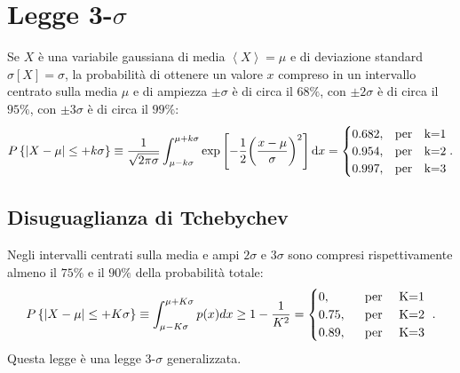\section{Legge 3-$\sigma$} %
\label{sec:tre-sigma}
Se $X$ è una variabile gaussiana di media $\left< X \right> =\mu $ e di deviazione standard $\sigma \left[ X \right] =\sigma $, la probabilità di ottenere un valore $x$ compreso in un intervallo centrato sulla media $\mu$ e di ampiezza $\pm \sigma$ è di circa il $68\%$, con $\pm 2\sigma$ è di circa il $95\%$, con $\pm 3\sigma$ è di circa il $99\%$:
\begin{equation}
P\left\{ \left| X-\mu  \right| \le +k\sigma  \right\} \equiv \frac { 1 }{ \sqrt { 2\pi \sigma  }  } \int _{ \mu -k\sigma  }^{ \mu +k\sigma  }{ \textrm{exp}\left[ -\frac { 1 }{ 2 } { \left( \frac { x-\mu  }{ \sigma  }  \right)  }^{ 2 } \right] \textrm{d}x } = \begin{cases} 0.682, & \text{\textrm{per}\quad k=1} \\ 0.954, &  \text{\textrm{per}\quad k=2} \\ 0.997, & \text{\textrm{per}\quad k=3} \end{cases}.
\end{equation}

\subsection{Disuguaglianza di Tchebychev} %
\label{subsec:disuguaglianza-tche}
Negli intervalli centrati sulla media e ampi $2\sigma$ e $3\sigma$ sono compresi rispettivamente almeno il $75\%$ e il $90\%$ della probabilità totale:
\begin{equation}
P\left\{ \left| X-\mu  \right| \le +K\sigma  \right\} \equiv \int _{ \mu -K\sigma  }^{ \mu +K\sigma  }{ p(x){ d }x } \ge 1-\frac { 1 }{ { K }^{ 2 } } =\begin{cases} 0, & \text{ \textrm{ per }\quad K=1 } \\ 0.75, & \text{ \textrm{ per }\quad K=2 } \\ 0.89, & \text{ \textrm{ per }\quad K=3 } \end{cases}.
\end{equation}
Questa legge è una legge 3-$\sigma$ generalizzata.


